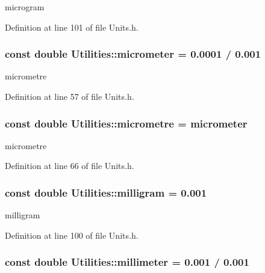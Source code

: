 microgram 



Definition at line 101 of file Units.h.

\hypertarget{namespace_utilities_a99dfe40c94af0523293210aaf01a0435}{
\subsubsection[{micrometer}]{\setlength{\rightskip}{0pt plus 5cm}const double {\bf Utilities::micrometer} = 0.0001 / 0.001}}
\label{namespace_utilities_a99dfe40c94af0523293210aaf01a0435}


micrometre 



Definition at line 57 of file Units.h.

\hypertarget{namespace_utilities_a6d2f4eead5bcae530f7c08291bf86931}{
\subsubsection[{micrometre}]{\setlength{\rightskip}{0pt plus 5cm}const double {\bf Utilities::micrometre} = {\bf micrometer}}}
\label{namespace_utilities_a6d2f4eead5bcae530f7c08291bf86931}


micrometre 



Definition at line 66 of file Units.h.

\hypertarget{namespace_utilities_acad791e8ae3f5eb81fa1aeb7abf90f9f}{
\subsubsection[{milligram}]{\setlength{\rightskip}{0pt plus 5cm}const double {\bf Utilities::milligram} = 0.001}}
\label{namespace_utilities_acad791e8ae3f5eb81fa1aeb7abf90f9f}


milligram 



Definition at line 100 of file Units.h.

\hypertarget{namespace_utilities_ae8c7101098fba61f862817a083c422ca}{
\subsubsection[{millimeter}]{\setlength{\rightskip}{0pt plus 5cm}const double {\bf Utilities::millimeter} = 0.001 / 0.001}}
\label{namespace_utilities_ae8c7101098fba61f862817a083c422ca}


